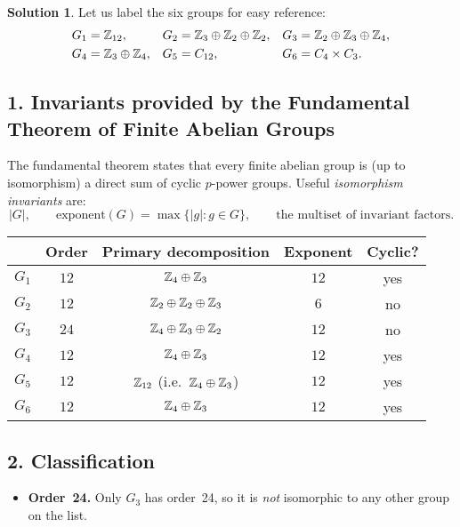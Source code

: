\documentclass[12pt]{article}
\theoremstyle{definition} %
\newtheorem{solution}{Solution}
\theoremstyle{plain} %
\begin{document}
\begin{solution}
Let us label the six groups for easy reference:
\[
\begin{aligned}
G_1 &= \Bbb Z_{12}, &
G_2 &= \Bbb Z_3 \oplus \Bbb Z_2 \oplus \Bbb Z_2, &
G_3 &= \Bbb Z_2 \oplus \Bbb Z_3 \oplus \Bbb Z_4,\\
G_4 &= \Bbb Z_3 \oplus \Bbb Z_4, &
G_5 &= C_{12}, &
G_6 &= C_4 \times C_3.
\end{aligned}
\]

\subsection*{1.\;  Invariants provided by the Fundamental Theorem of Finite Abelian Groups}
The fundamental theorem states that every finite abelian group is (up to
isomorphism) a direct sum of cyclic \(p\)-power groups.  Useful
\emph{isomorphism invariants} are:
\[
\lvert G\rvert,\qquad
\text{exponent}(G)=\max\{\lvert g\rvert:g\in G\},\qquad
\text{the multiset of invariant factors.}
\]

\begin{center}
\renewcommand{\arraystretch}{1.15}
\begin{tabular}{c|c c c c}
 & Order & Primary decomposition & Exponent & Cyclic?\\\hline
\(G_1\) & \(12\) & \(\Bbb Z_4\oplus\Bbb Z_3\) & \(12\) & yes\\
\(G_2\) & \(12\) & \(\Bbb Z_2\oplus\Bbb Z_2\oplus\Bbb Z_3\) & \(6\)  & no\\
\(G_3\) & \(24\) & \(\Bbb Z_4\oplus\Bbb Z_3\oplus\Bbb Z_2\) & \(12\) & no\\
\(G_4\) & \(12\) & \(\Bbb Z_4\oplus\Bbb Z_3\) & \(12\) & yes\\
\(G_5\) & \(12\) & \(\Bbb Z_{12}\) (i.e.\ \(\Bbb Z_4\oplus\Bbb Z_3\)) & \(12\) & yes\\
\(G_6\) & \(12\) & \(\Bbb Z_4\oplus\Bbb Z_3\) & \(12\) & yes\\
\end{tabular}
\end{center}

\subsection*{2.\;  Classification}
\begin{itemize}
  \item \textbf{Order~24.}\; Only \(G_3\) has order 24, so it is
        \emph{not} isomorphic to any other group on the list.


\end{itemize}
\end{solution}
\end{document}
